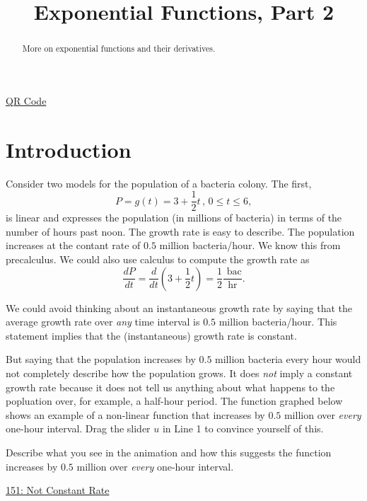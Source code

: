 \documentclass{ximera}
\title{Exponential Functions, Part 2}
\begin{document}
\begin{abstract}
More on exponential functions and their derivatives. 
\end{abstract}
\maketitle


\href{https://www.desmos.com/calculator/emp4pukecm}{QR Code}

 
\begin{onlineOnly}
    \begin{center}
\end{center}
\end{onlineOnly}


\section{Introduction}

Consider two models for the population of a bacteria colony. The first,
\[
      P = g(t) =3 +\frac{1}{2}t \, , \, 0\leq t \leq 6,
\]
is linear and expresses the population (in millions of bacteria) in terms of the number of hours past noon. The growth rate is easy to describe. The population increases at the contant rate of $0.5$ million bacteria/hour. We know this from precalculus. We could also use calculus to compute the growth rate as
\[
    \frac{dP}{dt} = \frac{d}{dt}\left(  3 +\frac{1}{2}t   \right) = \frac{1}{2} \frac{\text{ bac}}{\text{hr}}.
\]

We could avoid thinking about an instantaneous growth rate by saying that the average growth rate over \emph{any} time interval is $0.5$ million bacteria/hour. This statement implies that the (instantaneous) growth rate is constant. 

But saying that the population increases by $0.5$ million bacteria every hour would not completely describe how the population grows. It does \emph{not} imply a constant growth rate because it does not tell us anything about what happens to the popluation over, for example, a half-hour period. The function graphed below shows an example of a non-linear function that increases by $0.5$ million over \emph{every} one-hour interval. Drag the slider $u$ in Line 1 to convince yourself of this.

\begin{question} \label{Qld4f3}
Describe what you see in the animation and how this suggests the function increases by $0.5$ million over \emph{every} one-hour interval.

\begin{freeResponse}
\end{freeResponse}

\href{https://www.desmos.com/calculator/ehtzdzckmy}{151: Not Constant Rate}

 
\begin{onlineOnly}
    \begin{center}
\end{center}
\end{onlineOnly}

\end{question}
\end{document}
